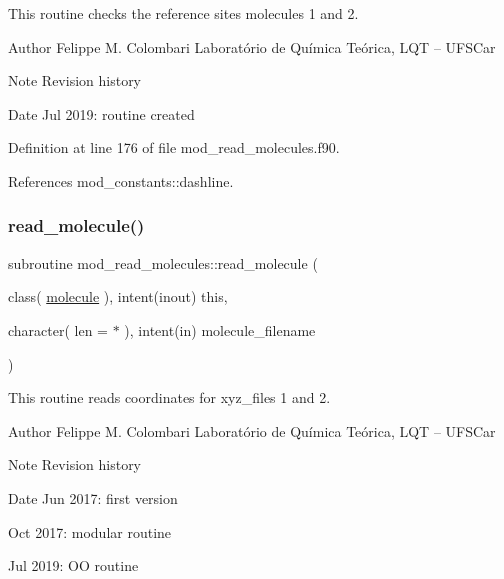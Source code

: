 This routine checks the reference sites molecules 1 and 2. 

\begin{DoxyAuthor}{Author}
Felippe M. Colombari Laboratório de Química Teórica, L\+QT -- U\+F\+S\+Car 
\end{DoxyAuthor}
\begin{DoxyNote}{Note}
Revision history 
\end{DoxyNote}
\begin{DoxyDate}{Date}
Jul 2019\+: routine created 
\end{DoxyDate}


Definition at line 176 of file mod\+\_\+read\+\_\+molecules.\+f90.



References mod\+\_\+constants\+::dashline.

\mbox{\label{namespacemod__read__molecules_a61dd5623986abe13f76dfed8a5ad1e35}} 
\subsubsection{\texorpdfstring{read\+\_\+molecule()}{read\_molecule()}}
{\footnotesize\ttfamily subroutine mod\+\_\+read\+\_\+molecules\+::read\+\_\+molecule (\begin{DoxyParamCaption}\item[{class( \hyperlink{structmod__read__molecules_1_1molecule}{molecule} ), intent(inout)}]{this,  }\item[{character( len = $\ast$ ), intent(in)}]{molecule\+\_\+filename }\end{DoxyParamCaption})}



This routine reads coordinates for xyz\+\_\+files 1 and 2. 

\begin{DoxyAuthor}{Author}
Felippe M. Colombari Laboratório de Química Teórica, L\+QT -- U\+F\+S\+Car 
\end{DoxyAuthor}
\begin{DoxyNote}{Note}
Revision history 
\end{DoxyNote}
\begin{DoxyDate}{Date}
Jun 2017\+: first version 

Oct 2017\+: modular routine 

Jul 2019\+: OO routine 
\end{DoxyDate}



